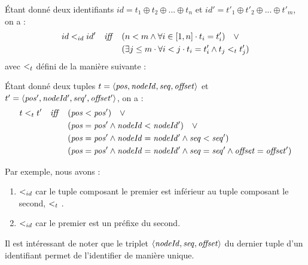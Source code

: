 \begin{definition}
  Étant donné deux identifiants $id = t_1 \oplus t_2 \oplus ... \oplus t_n$ et $id' = t'_1 \oplus t'_2 \oplus ... \oplus t'_m$, on a :
  \begin{equation*}
    \begin{split}
      id <_{id} id' \quad \mathit{iff} \quad     & (n < m \land \forall i \in [1,n] \cdot t_i = t'_i) \quad \lor \\
                                            & (\exists j \leq m \cdot \forall i < j \cdot t_i = t'_i \land t_j <_{t} t'_j) \\
    \end{split}
  \end{equation*}
  avec $<_{t}$ défini de la manière suivante :
  \begin{subdefinition}
    Étant donné deux tuples $t = \langle \mathit{pos},\mathit{nodeId},\mathit{seq},\mathit{offset} \rangle$ et $t' = \langle \mathit{pos'},\mathit{nodeId'},\mathit{seq'},\mathit{offset'} \rangle$, on a :
    \begin{equation*}
      \begin{split}
        t <_{t} t' \quad \mathit{iff} \quad  & (\mathit{pos} < \mathit{pos}') \quad \lor \\
                                            & (\mathit{pos} = \mathit{pos'} \land \mathit{nodeId} < \mathit{nodeId'}) \quad \lor \\
                                            & (\mathit{pos} = \mathit{pos'} \land \mathit{nodeId} = \mathit{nodeId'} \land \mathit{seq} < \mathit{seq'}) \\
                                            & (\mathit{pos} = \mathit{pos'} \land \mathit{nodeId} = \mathit{nodeId'} \land \mathit{seq} = \mathit{seq'} \land \mathit{offset} = \mathit{offset'}) \\
      \end{split}
    \end{equation*}
  \end{subdefinition}
\end{definition}

Par exemple, nous avons :
\begin{enumerate}
  \item  {} $<_{id}$  car le tuple composant le premier est inférieur au tuple composant le second, \ie {} $<_{t}$ .
  \item {} $<_{id}$  car le premier est un préfixe du second.
\end{enumerate}

Il est intéressant de noter que le triplet $\langle \mathit{nodeId},\mathit{seq},\mathit{offset} \rangle$ du dernier tuple d'un identifiant permet de l'identifier de manière unique.
